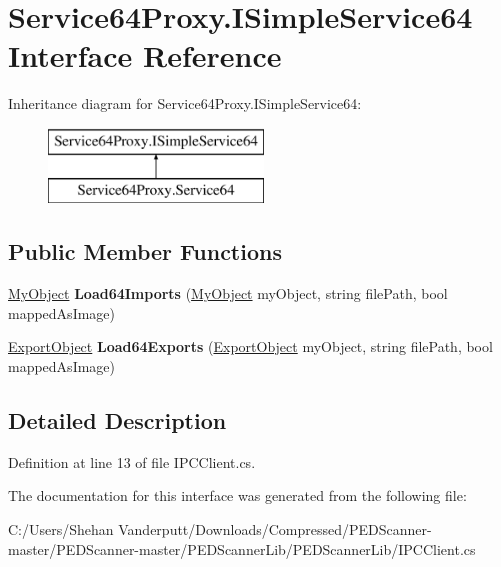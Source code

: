 \hypertarget{interface_service64_proxy_1_1_i_simple_service64}{}\section{Service64\+Proxy.\+I\+Simple\+Service64 Interface Reference}
\label{interface_service64_proxy_1_1_i_simple_service64}
Inheritance diagram for Service64\+Proxy.\+I\+Simple\+Service64\+:\begin{figure}[H]
\begin{center}
\leavevmode
\includegraphics[height=2.000000cm]{interface_service64_proxy_1_1_i_simple_service64}
\end{center}
\end{figure}
\subsection*{Public Member Functions}
\begin{DoxyCompactItemize}
\item 
\mbox{\label{interface_service64_proxy_1_1_i_simple_service64_a610966ca798e051a3cfe856f42fc3411}} 
\mbox{\hyperlink{class_objects_1_1_my_object}{My\+Object}} {\bfseries Load64\+Imports} (\mbox{\hyperlink{class_objects_1_1_my_object}{My\+Object}} my\+Object, string file\+Path, bool mapped\+As\+Image)
\item 
\mbox{\label{interface_service64_proxy_1_1_i_simple_service64_a919e029368d2cd30fd1434bd52a1ac83}} 
\mbox{\hyperlink{class_objects_1_1_export_object}{Export\+Object}} {\bfseries Load64\+Exports} (\mbox{\hyperlink{class_objects_1_1_export_object}{Export\+Object}} my\+Object, string file\+Path, bool mapped\+As\+Image)
\end{DoxyCompactItemize}


\subsection{Detailed Description}


Definition at line 13 of file I\+P\+C\+Client.\+cs.



The documentation for this interface was generated from the following file\+:\begin{DoxyCompactItemize}
\item 
C\+:/\+Users/\+Shehan Vanderputt/\+Downloads/\+Compressed/\+P\+E\+D\+Scanner-\/master/\+P\+E\+D\+Scanner-\/master/\+P\+E\+D\+Scanner\+Lib/\+P\+E\+D\+Scanner\+Lib/I\+P\+C\+Client.\+cs\end{DoxyCompactItemize}
